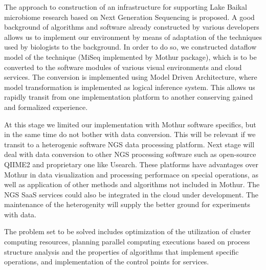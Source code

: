 \documentclass[a4paper]{jpconf}
\begin{document}
The approach to construction of an infrastructure for supporting Lake Baikal microbiome research based on Next Generation Sequencing is proposed. A good background of algorithms and software already constructed by various developers allows us to implement our environment by means of adaptation of the techniques used by biologists to the background.  In order to do so, we constructed dataflow model of the technique (MiSeq implemented by Mothur package), which is to be converted to the software modules of various visual environments and cloud services.  The conversion is implemented using Model Driven Architecture, where model transformation is implemented as logical inference system. This allows us rapidly transit from one implementation platform to another conserving gained and formalized experience.


At this stage we limited our implementation with Mothur software specifics, but in the same time do not bother with data conversion.  This will be relevant if we transit to a heterogenic software NGS data processing platform.  Next stage will deal with data conversion to other NGS processing software such as open-source QIIME2 and proprietary one like Usearch.  These platforms have advantages over Mothur in data visualization and processing performace on special operations, as well as application of other methods and algorithms not included in Mothur. The NGS SaaS services \cite{guo16} could also be integrated in the cloud under development.  The maintenance of the heterogenity will supply the better ground for experiments with data.


The problem set to be solved includes optimization of the utilization of cluster computing resources, planning parallel computing executions based on process structure analysis and the properties of algorithms that implement specific operations, and implementation of the control points for services.
\end{document}
